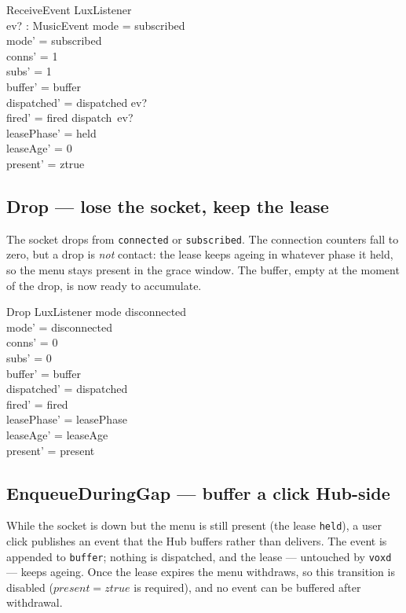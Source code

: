 \documentclass[a4paper,10pt,fleqn]{article}
\begin{document}
\begin{schema}{ReceiveEvent}
  \Delta LuxListener \\
  ev? : MusicEvent
  \where
  mode = subscribed \\
  mode' = subscribed \\
  conns' = 1 \\
  subs' = 1 \\
  buffer' = buffer \\
  dispatched' = dispatched \cat \langle ev? \rangle \\
  fired' = fired \cat \langle dispatch~ev? \rangle \\
  leasePhase' = held \\
  leaseAge' = 0 \\
  present' = ztrue
\end{schema}

\subsection{Drop --- lose the socket, keep the lease}

The socket drops from \texttt{connected} or \texttt{subscribed}. The connection
counters fall to zero, but a drop is \emph{not} contact: the lease keeps ageing
in whatever phase it held, so the menu stays present in the grace window. The
buffer, empty at the moment of the drop, is now ready to accumulate.

\begin{schema}{Drop}
  \Delta LuxListener
  \where
  mode \neq disconnected \\
  mode' = disconnected \\
  conns' = 0 \\
  subs' = 0 \\
  buffer' = buffer \\
  dispatched' = dispatched \\
  fired' = fired \\
  leasePhase' = leasePhase \\
  leaseAge' = leaseAge \\
  present' = present
\end{schema}

\subsection{EnqueueDuringGap --- buffer a click Hub-side}

While the socket is down but the menu is still present (the lease
\texttt{held}), a user click publishes an event that the Hub buffers rather than
delivers. The event is appended to \texttt{buffer}; nothing is dispatched, and
the lease --- untouched by \texttt{voxd} --- keeps ageing. Once the lease expires
the menu withdraws, so this transition is disabled ($present = ztrue$ is
required), and no event can be buffered after withdrawal.
\end{document}
